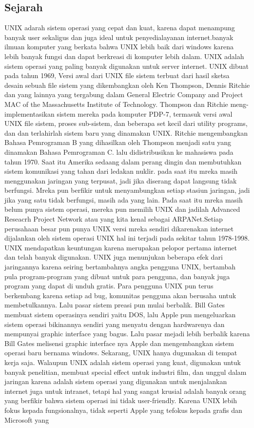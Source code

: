 		\subsection{Sejarah}
		\hspace*{1cm}UNIX adarah sistem operasi yang cepat dan kuat, karena dapat menampung banyak user sekaligus dan juga ideal untuk penyedialayanan internet.banyak ilmuan komputer yang berkata bahwa UNIX lebih baik dari windows karena lebih banyak fungsi dan dapat berkreasi di komputer lebih dalam. UNIX adalah sistem operasi yang paling banyak digunakan untuk server internet. UNIX dibuat pada tahun 1969, Versi awal dari UNIX file sistem terbuat dari hasil sketsa desain sebuah file sistem yang dikembangkan oleh Ken Thompson, Dennis Ritchie dan yang lainnya yang tergabung dalam General Electric Company and Project MAC of the Massachusetts Institute of Technology. Thompson dan Ritchie meng-implementasikan sistem mereka pada komputer PDP-7, termasuk versi awal UNIX file sistem, proses sub-sistem, dan beberapa set kecil dari utility programs, dan dan terlahirlah sistem baru yang dinamakan UNIX. Ritchie mengembangkan Bahasa Pemrograman B yang dihasilkan oleh Thompson menjadi satu yang dinamakan Bahasa Pemrograman C. lalu didistribusikan ke mahasiswa pada tahun 1970. Saat itu Amerika sedaang dalam perang dingin dan membutuhkan sistem komunikasi yang tahan dari ledakan nuklir. pada saat itu mreka masih menggunakan jaringan yang terpusat, jadi jika diserang dapat langsung tidak berfungsi. Mreka pun berfikir untuk menyambungkan setiap stasiun jaringan, jadi jika yang satu tidak berfungsi, masih ada yang lain. Pada saat itu mreka masih belum punya sistem operasi, mereka pun memilih UNIX dan jadilah Advanced Reseacrh Project Network atau yang kita kenal sebagai ARPANet.Setiap perusahaan besar pun punya UNIX versi mreka sendiri dikarenakan internet dijalankan oleh sistem operasi UNIX hal ini terjadi pada sekitar tahun 1978-1998. UNIX mendapatkan keuntungan karena merupakan pelopor pertama internet dan telah banyak digunakan. UNIX juga menunjukan beberapa efek dari jaringannya karena  seiring bertambahnya angka pengguna UNIX, bertambah pula program-program yang dibuat untuk para pengguna, dan banyak juga program yang dapat di unduh gratis. Para pengguna UNIX pun terus berkembang karena setiap ad bug, komunitas pengguna akan berusaha untuk membetulkannya. Lalu pasar sistem preasi pun mulai berbalik. Bill Gates membuat sistem operasinya sendiri yaitu DOS, lalu Apple pun mengeluarkan sistem operasi bikinannya sendiri yang menyatu dengan hardwarenya dan mempunyai graphic interface yang bagus. Lalu pasar mejadi lebih berbalik karena Bill Gates melisensi graphic interface nya Apple dan mengembangkan sistem operasi baru bernama windows. Sekarang, UNIX hanya dugunakan di tempat kerja saja. Walaupun UNIX adalah sistem operasi yang kuat, digunakan untuk banyak penelitian, membuat special effect untuk industri film, dan unggul dalam jaringan karena adalah sistem operasi yang digunakan untuk menjalankan internet juga untuk intranet, tetapi hal yang sangat krusial adalah banyak orang yang berfikir bahwa sistem operasi ini tidak user-friendly. Karena UNIX lebih fokus kepada fungsionalnya, tidak seperti Apple yang tefokus kepada grafis dan Microsoft yang 